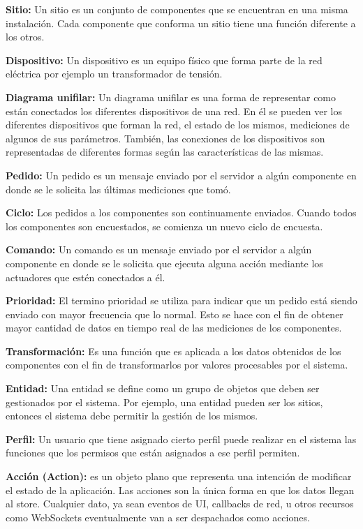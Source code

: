 			\textbf{Sitio:} Un sitio es un conjunto de componentes que se encuentran en una misma instalación. Cada componente que conforma un sitio tiene una función diferente a los otros.
			
			\textbf{Dispositivo:} Un dispositivo es un equipo físico que forma parte de la red eléctrica por ejemplo un transformador de tensión.
			
			\textbf{Diagrama unifilar:} Un diagrama unifilar es una forma de representar como están conectados los diferentes dispositivos de una red. En él se pueden ver los diferentes dispositivos que forman la red, el estado de los mismos, mediciones de algunos de sus parámetros. También, las conexiones de los dispositivos son representadas de diferentes formas según las características de las mismas.
			
			\textbf{Pedido:} Un pedido es un mensaje enviado por el servidor a algún componente en donde se le solicita las últimas mediciones que tomó.
			
			\textbf{Ciclo:} Los pedidos a los componentes son continuamente enviados. Cuando todos los componentes son encuestados, se comienza un nuevo ciclo de encuesta.
			
			\textbf{Comando:} Un comando es un mensaje enviado por el servidor a algún componente en donde se le solicita que ejecuta alguna acción mediante los actuadores que estén conectados a él.
			
			\textbf{Prioridad:} El termino prioridad se utiliza para indicar que un pedido está siendo enviado con mayor frecuencia que lo normal. Esto se hace con el fin de obtener mayor cantidad de datos en tiempo real de las mediciones de los componentes.
			
			\textbf{Transformación:} Es una función que es aplicada a los datos obtenidos de los componentes con el fin de transformarlos por valores procesables por el sistema.
			
			\textbf{Entidad:} Una entidad se define como un grupo de objetos que deben ser gestionados por el sistema. Por ejemplo, una entidad pueden ser los sitios, entonces el sistema debe permitir la gestión de los mismos.
			
			\textbf{Perfil:} Un usuario que tiene asignado cierto perfil puede realizar en el sistema las funciones que los permisos que están asignados a ese perfil permiten.
			
			\textbf{Acción (Action):} es un objeto plano que representa una intención de modificar el estado de la aplicación. Las acciones son la única forma en que los datos llegan al store. Cualquier dato, ya sean eventos de UI, callbacks de red, u otros recursos como WebSockets eventualmente van a ser despachados como acciones.
			

